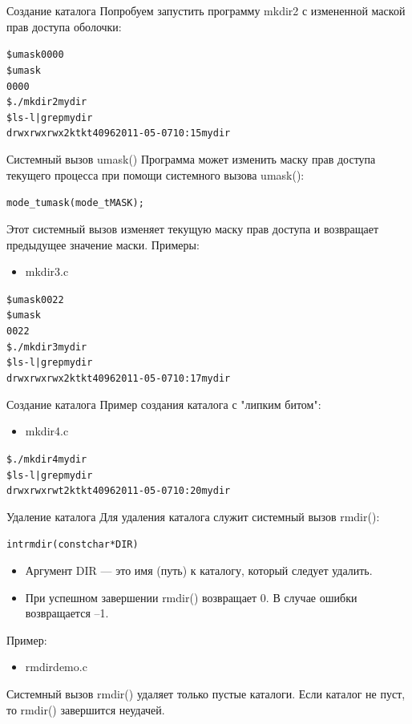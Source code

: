 \documentclass{beamer}
\begin{document}
\begin{frame}[fragile]{Создание каталога}
Попробуем запустить программу mkdir2 с измененной маской прав доступа оболочки:
\begin{alltt}
\$ umask 0000
\$ umask
0000
\$ ./mkdir2 mydir
\$ ls -l | grep mydir
drwxrwxrwx 2 kt kt 4096 2011-05-07 10:15 mydir
\end{alltt}
\end{frame}

\begin{frame}[fragile]{Системный вызов umask()}
Программа может изменить маску прав доступа текущего процесса при помощи
системного вызова umask():
\begin{alltt}
mode_t umask (mode_t MASK);
\end{alltt}
Этот системный вызов изменяет текущую маску прав доступа и возвращает предыдущее значение маски.
Примеры: 
\begin{itemize}
\item mkdir3.c
\end{itemize}
\begin{alltt}
\$ umask 0022
\$ umask
0022
\$ ./mkdir3 mydir
\$ ls -l | grep mydir
drwxrwxrwx 2 kt kt 4096 2011-05-07 10:17 mydir
\end{alltt}
\end{frame}

\begin{frame}[fragile]{Создание каталога}
Пример создания каталога с "липким битом":  
\begin{itemize}
\item mkdir4.c
\end{itemize}
\begin{alltt}
\$ ./mkdir4 mydir
\$ ls -l | grep mydir
drwxrwxrwt 2 kt kt 4096 2011-05-07 10:20 mydir
\end{alltt}
\end{frame}

\begin{frame}[fragile]{Удаление каталога}
Для удаления каталога служит системный вызов rmdir():
\begin{alltt}
int rmdir (const char * DIR)
\end{alltt}
\begin{itemize}
\item Аргумент DIR — это имя (путь) к каталогу, который следует удалить.
\item При успешном завершении rmdir() возвращает 0. В случае ошибки возвращается –1. 
\end{itemize}
Пример: 
\begin{itemize}
\item rmdirdemo.c
\end{itemize}
Системный вызов rmdir() удаляет только пустые каталоги. Если каталог не пуст, то rmdir() завершится неудачей.
\end{frame}

\end{document}
